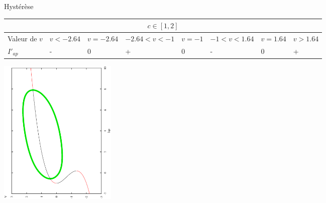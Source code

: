 \documentclass[xcolor={dvipsnames},10pt]{beamer}
\begin{document}
\begin{frame}{Hystérèse}
\begin{center}
\begin{tiny}
\begin{tabular}{|L{1cm} | C{0.8cm} | C{0.8cm} | C{0.8cm} |C{0.8cm}|C{0.8cm}|C{0.8cm}|C{0.8cm}|}
\hline
{}
\\\hline
Valeur de $v$ & $v < -2.64$ & $v = -2.64$ & $ -2.64 < v < -1$ & $v = -1$ & $-1 < v < 1.64$ & $v=1.64$ & $v > 1.64$ \\
 \hline
$I'_{ap}$ & - & 0 & + & 0 & - & 0 & +\\ \hline
\end{tabular}
\end{tiny}
\includegraphics[height = 7cm, angle = 270]{Diag_bif_c_2.eps}
\end{center}
\end{frame}
\end{document}
